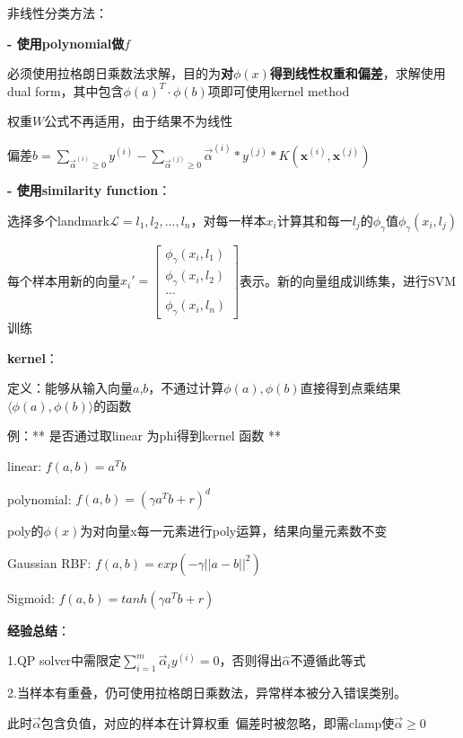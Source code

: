 \documentclass[UTF8]{ctexart}
\begin{document}
  非线性分类方法：

  \textbf{- 使用polynomial做$f$}

  \quad 必须使用拉格朗日乘数法求解，目的为\textbf{对$\phi(x)$得到线性权重和偏差}，求解使用dual form，其中包含$\phi(a)^T \cdot \phi(b)$项即可使用kernel method

  \quad 权重$W$公式不再适用，由于结果不为线性

  \quad 偏差$b = \sum_{\vec{\alpha}^{(i)} \geq 0} y^{(i)} - \sum_{\vec{\alpha}^{(j)} \geq 0} \vec{\alpha}^{(i)} * y^{(j)} * K(\mathbf{x}^{(i)}, \mathbf{x}^{(j)})$

  \textbf{- 使用similarity function}：
  
  \quad 选择多个landmark$\mathcal{L} = l_1, l_2, ..., l_n$，对每一样本$x_i$计算其和每一$l_j$的$\phi_{\gamma}$值$\phi_{\gamma}(x_i, l_j)$

  \quad 每个样本用新的向量$x_i' = \begin{bmatrix}
    \phi_{\gamma}(x_i, l_1) \\
    \phi_{\gamma}(x_i, l_2) \\
    ... \\
    \phi_{\gamma}(x_i, l_n)
  \end{bmatrix}$表示。新的向量组成训练集，进行SVM训练

  \textbf{kernel}：

  \quad 定义：能够从输入向量$a$,$b$，不通过计算$\phi(a), \phi(b)$直接得到点乘结果$\langle \phi (a), \phi (b)\rangle $的函数

  \quad 例：** 是否通过取linear 为phi得到kernel 函数 **

  \quad \quad linear: $f(a, b) = a^Tb$

  \quad \quad polynomial: $f(a, b) = (\gamma a^Tb+r)^d$

  \quad \quad \quad poly的$\phi(x)$为对向量x每一元素进行poly运算，结果向量元素数不变

  \quad \quad Gaussian RBF: $f(a, b) = exp(-\gamma ||a-b||^2)$

  \quad \quad Sigmoid: $f(a, b) = tanh(\gamma a^Tb + r)$

  \quad \textbf{经验总结}：

  \quad \quad 1.QP solver中需限定$\sum_{i=1}^{m}\vec{\alpha}_iy^{(i)}=0$，否则得出$\hat{\alpha}$不遵循此等式

  \quad \quad 2.当样本有重叠，仍可使用拉格朗日乘数法，异常样本被分入错误类别。

  \quad \quad \quad 此时$\vec{\alpha}$包含负值，对应的样本在计算权重\ 偏差时被忽略，即需clamp使$\vec{\alpha} \geq 0$
\end{document}
